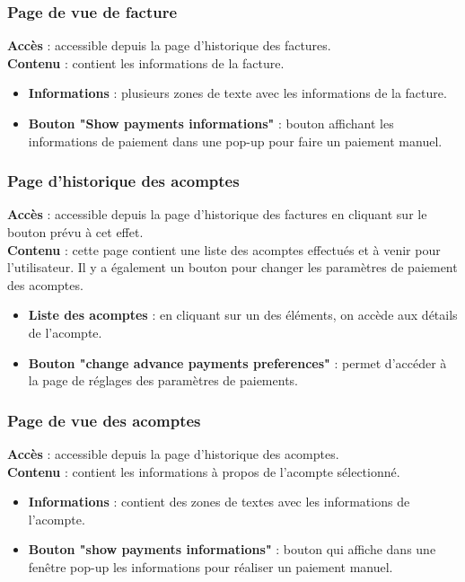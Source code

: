 \documentclass[../rapport.tex]{subfiles}
\begin{document}
\subsubsection{Page de vue de facture}
\noindent \textbf{Accès} : accessible depuis la page d'historique des factures. \\
\textbf{Contenu} : contient les informations de la facture.
\begin{itemize}
    \item \textbf{Informations} : plusieurs zones de texte avec les informations de la facture.
    \item \textbf{Bouton "Show payments informations"} : bouton affichant les informations de paiement dans une pop-up pour faire un paiement manuel. 
\end{itemize}

\subsubsection{Page d'historique des acomptes}
\noindent \textbf{Accès} : accessible depuis la page d'historique des factures en cliquant sur le bouton prévu à cet effet. \\
\textbf{Contenu} : cette page contient une liste des acomptes effectués et à venir pour l'utilisateur. Il y a également un bouton pour changer les paramètres de paiement des acomptes.
\begin{itemize}
    \item \textbf{Liste des acomptes} : en cliquant sur un des éléments, on accède aux détails de l'acompte.
    \item \textbf{Bouton "change advance payments preferences"} : permet d'accéder à la page de réglages des paramètres de paiements.
\end{itemize}

\subsubsection{Page de vue des acomptes}
\noindent \textbf{Accès} : accessible depuis la page d'historique des acomptes.\\
\textbf{Contenu} : contient les informations à propos de l'acompte sélectionné. 
\begin{itemize}
    \item \textbf{Informations} : contient des zones de textes avec les informations de l'acompte.
    \item \textbf{Bouton "show payments informations"} : bouton qui affiche dans une fenêtre pop-up les informations pour réaliser un paiement manuel.
\end{itemize}
\end{document}
